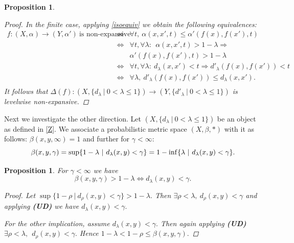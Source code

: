 \documentclass[12pt,a4paper]{amsart}
\theoremstyle{theorem}
\newtheorem{proposition}[theorem]{Proposition}
\theoremstyle{definition}
\renewcommand{\inf}{\myinf}
\DeclareMathOperator*{\myinf}{in\vphantom{p}f}
\renewcommand{\a}{\ensuremath{\alpha}}
\renewcommand{\b}{\ensuremath{\beta}}
\renewcommand{\l}{\ensuremath{\lambda}}
\def\rw{\rightarrow}
\begin{document}
{\begin{proposition}
\begin{proof}
 In the finite case, applying \eqref{isoequiv} we obtain the following equivalences:
  \begin{eqnarray*}\label{morfequiv}
  f: (X,\a) \rw (Y, \a')\  \text{is non-expansive} \ &\Leftrightarrow & \forall t, \ \a(x,x',t) \leq \a'(f(x), f(x'), t )\\
&\Leftrightarrow& \forall t, \forall \l : \ \ \a(x,x', t) > 1 - \l  \Rightarrow\\
&& \a'(f(x), f(x') , t) > 1 - \l \\
&\Leftrightarrow& \forall t,  \forall \l :  \  d_\l(x,x') < t \Rightarrow  d'_\l(f(x), f(x')) < t\\
&\Leftrightarrow& \forall \l, \  d'_\l(f(x), f(x')) \leq d_\l (x,x').\\
\end{eqnarray*}
It follows that $\Delta (f) : (X, \{ d_\l \ | \ 0 < \l \leq 1 \}) \rw (Y, \{ d'_\l \ | \ 0 < \l \leq 1 \}) $ is levelwise non-expansive.
\end{proof}
\end{proposition}

Next we investigate the other direction.
Let $(X, \{ d_\l \ | \ 0 < \l \leq 1 \})$ be an object as defined in \ref{Z}. We associate a probabilistic metric space $(X, \b, *)$
 with it as follows:
 $\b (x,y, \infty ) = 1$ and further for $\gamma < \infty$:
\begin{equation}\label{isomorphbeta}
\b(x,y,\gamma) = \sup \{1 - \l \ | \ d_\l(x, y) < \gamma\} = 1 - \inf  \{\l \ | \ d_\l (x, y) < \gamma\}.
\end{equation}

\begin{proposition}
For $\gamma< \infty$ we have
\begin{equation} \label{morphi}
\b(x,y,\gamma) > 1 - \l   \Leftrightarrow  d_\l(x, y) < \gamma.
\end{equation}
\begin{proof} 
Let  $\sup \{1 - \rho \ | \ d_\rho(x,y) < \gamma\}  > 1 - \l.$ Then $\exists \rho < \l, \ d_\rho(x,y) < \gamma$ and applying {\bf(UD)} we have 
$d_\l(x,y) < \gamma.$

For the other implication,  assume $d_\l(x,y) < \gamma.$ Then again applying {\bf(UD)}\\
 $\exists \rho < \l, 
 \  \ d_\rho(x,y) < \gamma.$
Hence $1 - \l < 1 - \rho \leq \b(x,y,\gamma).$

\end{proof}
\end{proposition}

}
\end{document}
